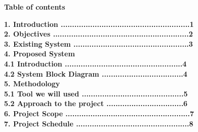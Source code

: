 \documentclass[a4paper]{article}
\begin{document}
\newpage
{


	\begin{center}
		\textbf{ \huge{Table of contents}}
		\vspace{30pt}
	\end{center}


	\vspace{20pt}

	\Large{

		\textbf{1. Introduction	.........................................................1 \\ }
		\vspace{20pt}
		\textbf{2. Objectives  ............................................................2\\}
		\vspace{20pt}
		\textbf{3. Existing System ...................................................3\\}
		\vspace{20pt}
		\textbf{4. Proposed System \\}
		\vspace{20pt}
		\hspace{15pt}\textbf{4.1 Introduction ....................................................4 \\}
		\vspace{20pt}
		\hspace{15pt}\textbf{4.2 System Block Diagram ....................................4 \\}
		\vspace{20pt}
		\textbf{5. Methodology \\}
		\vspace{20pt}
		\hspace{15pt}\textbf{5.1 Tool we will used .............................................5 \\}
		\vspace{20pt}
		\hspace{15pt}\textbf{5.2 Approach to the project ..................................6  \\}
		\vspace{20pt}
		\textbf{6. Project Scope .......................................................7 \\}
		\vspace{20pt}
		\textbf{7. Project Schedule ..................................................8}
		\vspace{20pt}

	}

}
\end{document}
